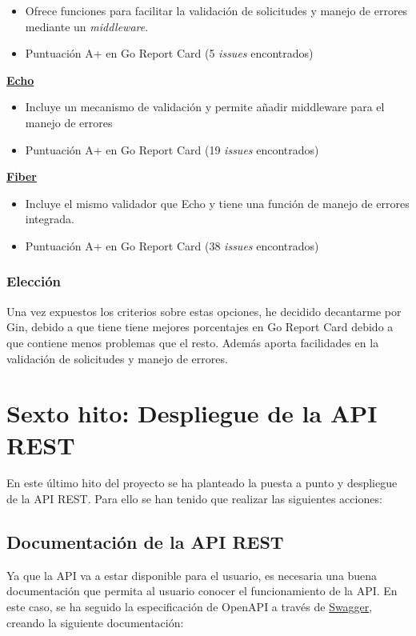 \begin{itemize}
\item
  Ofrece funciones para facilitar la validación de solicitudes y manejo de errores mediante un \textit{middleware}.
\item
  Puntuación A+ en Go Report Card (5 \textit{issues} encontrados)
\end{itemize}

\textbf{\href{https://pkg.go.dev/github.com/labstack/echo/v4}{Echo}}

\begin{itemize}
\item
  Incluye un mecanismo de validación y permite añadir middleware para el manejo de errores
\item
Puntuación A+ en Go Report Card (19 \textit{issues} encontrados)
\end{itemize}

\textbf{\href{https://pkg.go.dev/github.com/gofiber/fiber/v2}{Fiber}}

\begin{itemize}
\item
  Incluye el mismo validador que Echo y tiene una función de manejo de errores integrada.
\item
Puntuación A+ en Go Report Card (38 \textit{issues} encontrados)
\end{itemize}

\subsubsection{Elección}

Una vez expuestos los criterios sobre estas opciones, he decidido decantarme por Gin, debido a que tiene tiene mejores porcentajes en Go Report Card debido a que contiene menos problemas que el resto.
Además aporta facilidades en la validación de solicitudes y manejo de errores.

\newpage

\section{Sexto hito: Despliegue de la API REST}
En este último hito del proyecto se ha planteado la puesta a punto y despliegue de la API REST. Para ello se han tenido que realizar las siguientes acciones:

\subsection{Documentación de la API REST}
Ya que la API va a estar disponible para el usuario, es necesaria una buena documentación que permita al usuario conocer el funcionamiento de la API.
En este caso, se ha seguido la especificación de OpenAPI a través de \href{https://swagger.io/}{Swagger}, creando la siguiente documentación:

